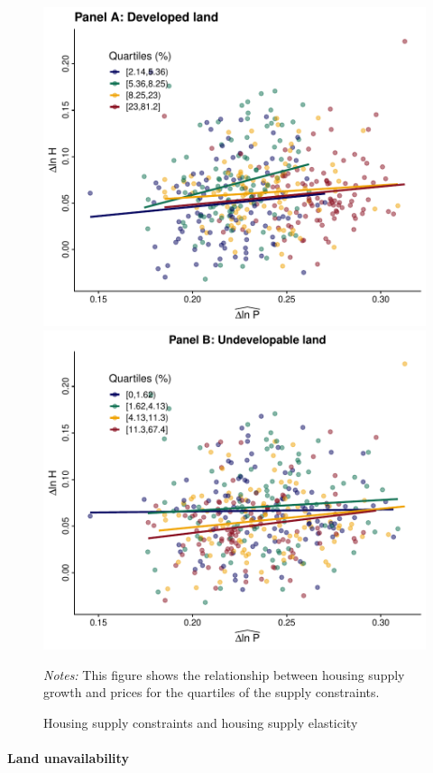 \documentclass[
  12pt,
]{article}
\begin{document}
\begin{figure}[H]
\centering

\begin{center}\includegraphics[width=0.495\linewidth]{output/figs/supply-constraints-elasticity-1} \includegraphics[width=0.495\linewidth]{output/figs/supply-constraints-elasticity-2} \end{center}

\caption{Housing supply constraints and housing supply elasticity}\label{fig:supply-constraints-elasticity}
\medskip
\begin{minipage}{0.9\textwidth}
\footnotesize
\textit{Notes:} This figure shows the relationship between housing supply growth and prices for the quartiles of the supply constraints. 
\end{minipage}
\end{figure}

\paragraph*{Land unavailability}\label{land-unavailability}
\end{document}
